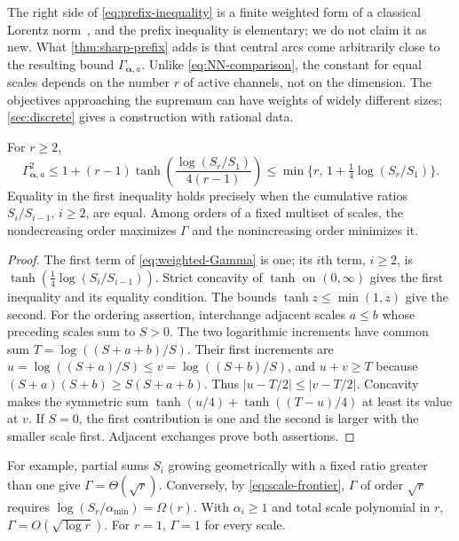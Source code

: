 The right side of \eqref{eq:prefix-inequality} is a finite weighted
form of a classical Lorentz norm~\cite{Lorentz1951}, and the prefix
inequality is elementary; we do not claim it as new. What
\cref{thm:sharp-prefix} adds is that central arcs come arbitrarily
close to the resulting bound $\Gamma_{\boldsymbol\alpha,a}$. Unlike \eqref{eq:NN-comparison}, the
constant for equal scales depends on the number $r$ of active channels,
not on the dimension. The objectives approaching the supremum can have
weights of widely different sizes; \cref{sec:discrete} gives a
construction with rational data.

\begin{proposition}
\label{prop:scale-order}
For $r\geq2$,
\begin{equation}
 \Gamma_{\boldsymbol\alpha,a}^2
 \leq1+(r-1)\tanh\left(\frac{\log(S_r/S_1)}{4(r-1)}\right)
 \leq\min\{r,\,1+\tfrac14\log(S_r/S_1)\}.
 \label{eq:scale-frontier}
\end{equation}
Equality in the first inequality holds precisely when the cumulative
ratios $S_i/S_{i-1}$, $i\geq2$, are equal. Among orders of a fixed
multiset of scales, the nondecreasing order maximizes $\Gamma$ and the
nonincreasing order minimizes it.
\end{proposition}
\begin{proof}
The first term of \eqref{eq:weighted-Gamma} is one; its $i$th term,
$i\geq2$, is $\tanh(\frac14\log(S_i/S_{i-1}))$.
Strict concavity of $\tanh$ on $(0,\infty)$ gives the first inequality
and its equality condition. The bounds $\tanh z\leq\min(1,z)$ give
the second.
For the ordering assertion, interchange adjacent scales $a\leq b$ whose
preceding scales sum to $S>0$. The two logarithmic increments have common sum
$T=\log((S+a+b)/S)$. Their first increments are
$u=\log((S+a)/S)\leq v=\log((S+b)/S)$, and $u+v\geq T$ because
$(S+a)(S+b)\geq S(S+a+b)$. Thus
$|u-T/2|\leq|v-T/2|$. Concavity makes the symmetric sum
$\tanh(u/4)+\tanh((T-u)/4)$ at least its value at $v$.
If $S=0$, the first contribution is one and the second is larger with
the smaller scale first. Adjacent exchanges prove both assertions.
\end{proof}
For example, partial sums $S_i$ growing geometrically with a fixed
ratio greater than one give $\Gamma=\Theta(\sqrt r)$. Conversely, by
\eqref{eq:scale-frontier}, $\Gamma$ of order $\sqrt r$ requires
$\log(S_r/\alpha_{\min})=\Omega(r)$. With
$\alpha_i\geq1$ and total scale polynomial in $r$,
$\Gamma=O(\sqrt{\log r})$. For $r=1$, $\Gamma=1$ for every scale.

